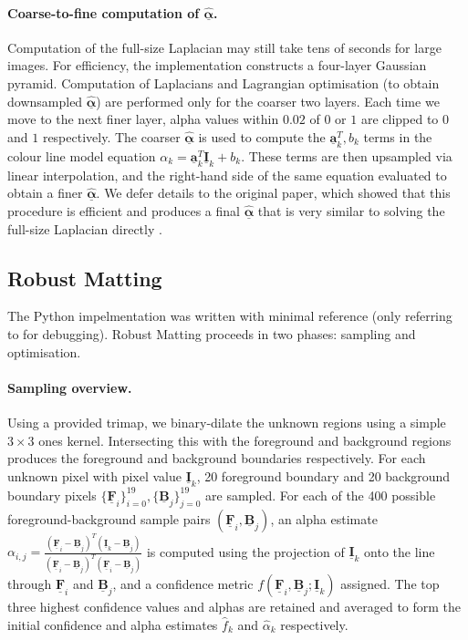 \documentclass{article}
\def\vt#1{\underline{\mathbf{#1}}}
\def\vts#1{\underline{\boldsymbol{#1}}}
\begin{document}
\begin{multicols}{2}[]
\paragraph{Coarse-to-fine computation of $\hat{\vts\alpha}$.} Computation of the full-size Laplacian may still take tens of seconds for large images. For efficiency, the implementation constructs a four-layer Gaussian pyramid. Computation of Laplacians and Lagrangian optimisation (to obtain downsampled $\hat{\vts\alpha}$) are performed only for the coarser two layers. Each time we move to the next finer layer, alpha values within $0.02$ of $0$ or $1$ are clipped to $0$ and $1$ respectively. The coarser $\hat{\vts\alpha}$ is used to compute the $\vt a_k^T, b_k$ terms in the colour line model equation $\alpha_k = \vt a_k^T \vt I_k + b_k$. These terms are then upsampled via linear interpolation, and the right-hand side of the same equation evaluated to obtain a finer $\hat{\vts\alpha}$. We defer details to the original paper, which showed that this procedure is efficient and produces a final $\hat{\vts\alpha}$ that is very similar to solving the full-size Laplacian directly \cite[\S4]{closed-form-matting}.





\subsection{Robust Matting}
The Python impelmentation was written with minimal reference (only referring to \cite{web:robust-cpp-github} for debugging). Robust Matting proceeds in two phases: sampling and optimisation.

\paragraph{Sampling overview.} Using a provided trimap, we binary-dilate the unknown regions using a simple $3\times 3$ ones kernel. Intersecting this with the foreground and background regions produces the foreground and background boundaries respectively. For each unknown pixel with pixel value $\vt I_k$, 20 foreground boundary and 20 background boundary pixels $\{\vt F_i\}_{i=0}^{19}, \{\vt B_j\}_{j=0}^{19}$ are sampled. For each of the 400 possible foreground-background sample pairs $(\vt F_i, \vt B_j)$, an alpha estimate $\alpha_{i,j} = \frac{\left(\vt F_i - \vt B_j\right)^T\left(\vt I_k - \vt B_j\right)}{\left(\vt F_i - \vt B_j\right)^T\left(\vt F_i - \vt B_j\right)}$ is computed using the projection of $\vt I_k$ onto the line through $\vt F_i$ and $\vt B_j$, and a confidence metric $f(\vt F_i, \vt B_j; \vt I_k)$ assigned. The top three highest confidence values and alphas are retained and averaged to form the initial confidence and alpha estimates $\hat f_k$ and $\hat{\alpha}_k$ respectively.


\end{multicols}
\end{document}
